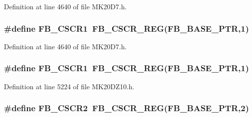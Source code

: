 Definition at line 4640 of file M\+K20\+D7.\+h.

\subsubsection[{\texorpdfstring{F\+B\+\_\+\+C\+S\+C\+R1}{FB_CSCR1}}]{\setlength{\rightskip}{0pt plus 5cm}\#define F\+B\+\_\+\+C\+S\+C\+R1~{\bf F\+B\+\_\+\+C\+S\+C\+R\+\_\+\+R\+EG}({\bf F\+B\+\_\+\+B\+A\+S\+E\+\_\+\+P\+TR},1)}\hypertarget{group___f_b___register___accessor___macros_ga779a99ad40919a1fcb72119db239a8d3}{}\label{group___f_b___register___accessor___macros_ga779a99ad40919a1fcb72119db239a8d3}


Definition at line 4640 of file M\+K20\+D7.\+h.

\subsubsection[{\texorpdfstring{F\+B\+\_\+\+C\+S\+C\+R1}{FB_CSCR1}}]{\setlength{\rightskip}{0pt plus 5cm}\#define F\+B\+\_\+\+C\+S\+C\+R1~{\bf F\+B\+\_\+\+C\+S\+C\+R\+\_\+\+R\+EG}({\bf F\+B\+\_\+\+B\+A\+S\+E\+\_\+\+P\+TR},1)}\hypertarget{group___f_b___register___accessor___macros_ga779a99ad40919a1fcb72119db239a8d3}{}\label{group___f_b___register___accessor___macros_ga779a99ad40919a1fcb72119db239a8d3}


Definition at line 5224 of file M\+K20\+D\+Z10.\+h.

\subsubsection[{\texorpdfstring{F\+B\+\_\+\+C\+S\+C\+R2}{FB_CSCR2}}]{\setlength{\rightskip}{0pt plus 5cm}\#define F\+B\+\_\+\+C\+S\+C\+R2~{\bf F\+B\+\_\+\+C\+S\+C\+R\+\_\+\+R\+EG}({\bf F\+B\+\_\+\+B\+A\+S\+E\+\_\+\+P\+TR},2)}\hypertarget{group___f_b___register___accessor___macros_ga83a40f5cce744e6d9010a2d44a1bdbe0}{}\label{group___f_b___register___accessor___macros_ga83a40f5cce744e6d9010a2d44a1bdbe0}


